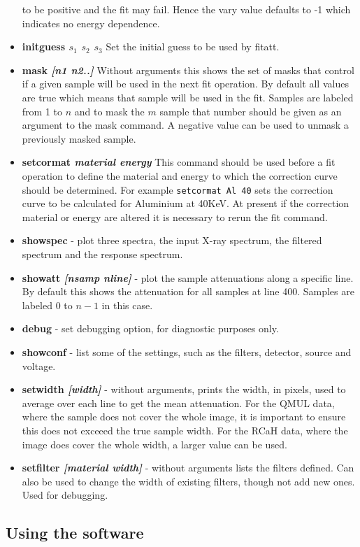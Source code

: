 \documentclass[a4paper]{article}
\begin{document}
\begin{itemize}
to be positive and the fit may fail. Hence the vary value defaults to -1 which indicates no energy dependence.
\item{\bf initguess \it{$s_1$ $s_2$ $s_3$}} Set the initial guess to be used by fitatt.
\item{\bf mask \it{[n1 n2..]}} Without arguments this shows the set of masks that control if a given sample will be used in the next fit operation.
By default all values are true which means that sample will be used in the fit. Samples are labeled from 1 to $n$ and to mask the $m$ sample
that number should be given as an argument to the mask command. A negative value can be used to unmask a previously masked sample.
\item{\bf setcormat \it{material energy}} This command should be used before a fit operation to define the material and energy to which the correction
curve should be determined. For example \texttt{setcormat Al 40} sets the correction curve to be calculated for Aluminium at 40KeV.
At present if the correction material or energy are altered it is necessary to rerun the fit command.
\item{\bf showspec} - plot three spectra, the input X-ray spectrum, the filtered spectrum and the response spectrum.
\item{\bf showatt \it[nsamp nline]} - plot the sample attenuations along a specific line. By default this shows the
attenuation for all samples at line 400. Samples are labeled 0 to $n-1$ in this case.
\item{\bf debug} - set debugging option, for diagnostic purposes only.
\item{\bf showconf} - list some of the settings, such as the filters, detector, source and voltage.
\item{\bf setwidth \it[width]} - without arguments, prints the width, in pixels, used to average over each line to get the mean
attenuation. For the QMUL data, where the sample does not cover the whole image, it is important to ensure this does not
exceeed the true sample width. For the RCaH data, where the image does cover the whole width, a larger value can be used.
\item{\bf setfilter \it[material width]} - without arguments lists the filters defined. Can also be used
to change the width of existing filters, though not add new ones. Used for debugging.

\end{itemize}

\subsection{Using the software}
\end{document}
